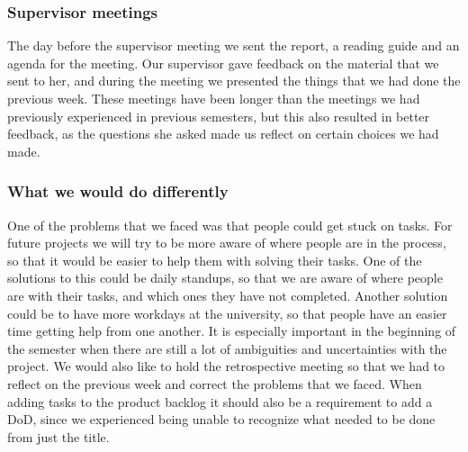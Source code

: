 \subsubsection{Supervisor meetings}
The day before the supervisor meeting we sent the report, a reading guide and an agenda for the meeting.
Our supervisor gave feedback on the material that we sent to her, and during the meeting we presented the things that we had done the previous week.
These meetings have been longer than the meetings we had previously experienced in previous semesters, but this also resulted in better feedback, as the questions she asked made us reflect on certain choices we had made.

\subsubsection{What we would do differently}
One of the problems that we faced was that people could get stuck on tasks.
For future projects we will try to be more aware of where people are in the process, so that it would be easier to help them with solving their tasks.
One of the solutions to this could be daily standups, so that we are aware of where people are with their tasks, and which ones they have not completed.
Another solution could be to have more workdays at the university, so that people have an easier time getting help from one another.
It is especially important in the beginning of the semester when there are still a lot of ambiguities and uncertainties with the project.  
We would also like to hold the retrospective meeting so that we had to reflect on the previous week and correct the problems that we faced.
When adding tasks to the product backlog it should also be a requirement to add a DoD, since we experienced being unable to recognize what needed to be done from just the title.
